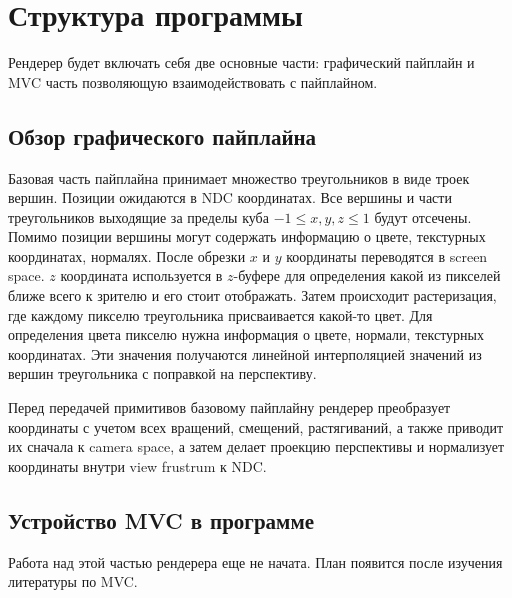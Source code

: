 \documentclass{article}
\begin{document}
\section{Структура программы}

Рендерер будет включать себя две основные части: графический пайплайн 
и MVC часть позволяющую взаимодействовать с пайплайном. 

\subsection{Обзор графического пайплайна}

Базовая часть пайплайна принимает множество треугольников в 
виде троек вершин. Позиции ожидаются в NDC координатах. Все вершины и
части треугольников выходящие за пределы куба $-1\leq x, y, z\leq 1$ 
будут отсечены. Помимо позиции вершины могут содержать информацию о цвете, 
текстурных координатах, нормалях. 
После обрезки $x$ и $y$ координаты 
переводятся в screen space. $z$ координата используется 
в $z$-буфере для определения какой из пикселей ближе всего 
к зрителю и его стоит отображать. Затем происходит растеризация, 
где каждому пикселю треугольника присваивается какой-то цвет. 
Для определения цвета пикселю нужна информация о цвете, нормали, 
текстурных координатах. Эти значения получаются линейной интерполяцией 
значений из вершин треугольника с поправкой на перспективу. 

Перед передачей примитивов базовому пайплайну рендерер 
преобразует координаты с учетом всех вращений, смещений, растягиваний, 
а также приводит их сначала к camera space, а затем делает 
проекцию перспективы и нормализует координаты внутри view frustrum 
к NDC. 

\subsection{Устройство MVC в программе}
Работа над этой частью рендерера еще не начата. 
План появится после изучения литературы по MVC.


\nocite{OpenGLMath}
\nocite{GameMath}
\nocite{CompGraphicsDynamic}
\nocite{CompGraphicsPolyg}



\end{document}
